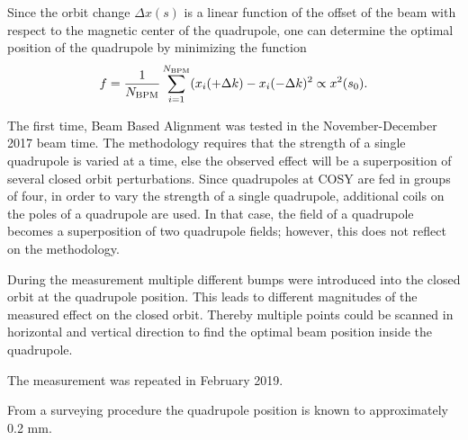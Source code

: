 Since the orbit change $\Delta x(s)$ is a linear function of the offset of the beam with respect to the magnetic center of the quadrupole, one can determine the optimal position of the quadrupole by minimizing the function
\[
f = \frac{1}{N_{\mathrm{BPM}}}\sum_{i=1}^{N_{\mathrm{BPM}}} (x_i(+\Delta k) -x_i(-\Delta k)^2 \propto x^2(s_0).
\]

The first time, Beam Based Alignment was tested in the November-December 2017 beam time. The methodology requires that the strength of a single quadrupole is varied at a time, else the observed effect will be a superposition
of several closed orbit perturbations. Since quadrupoles at COSY are fed in groups of four, in order to vary the strength of a single quadrupole, additional coils on the poles of a quadrupole are used. In that case, 
the field of a quadrupole becomes a superposition of two quadrupole fields; however, this does not reflect on the methodology. 

During the measurement multiple different bumps were introduced into the closed orbit
at the quadrupole position. This leads to different magnitudes of the measured effect on the
closed orbit. Thereby multiple points could be scanned in horizontal and vertical direction
to find the optimal beam position inside the quadrupole.~\cite[p.~60]{Wagner:BBA2018}

The measurement was repeated in February 2019.

From a surveying procedure the quadrupole position is known to approximately 0.2 mm.~\cite[\textbf{Results and achievements at COSY}]{YellowReport}